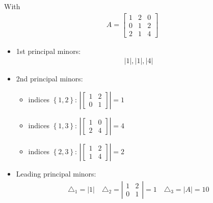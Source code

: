 \documentclass[11pt]{article}
\numberwithin{equation}{section}
\begin{document}
\begin{example}
    With \begin{align*}
        A=\left[\begin{array}{lll}
            1 & 2 & 0 \\
            0 & 1 & 2 \\
            2 & 1 & 4
            \end{array}\right]
    \end{align*}
    \begin{itemize}
        \item 1st principal minors: \begin{align*}
            |1|,|1|,|4|
        \end{align*}
        \item 2nd principal minors: \begin{itemize}
            \item indices $\left\{ 1,2 \right\}$: $\left| \left[\begin{array}{cc}
                1 & 2 \\
                0 & 1
                \end{array}\right]\right|=1$
            \item indices $\left\{ 1,3 \right\}$: $\left| \left[\begin{array}{cc}
                1 & 0 \\
                2 & 4
                \end{array}\right]\right|=4$
            \item indices $\left\{ 2,3 \right\}$: $\left| \left[\begin{array}{cc}
                1 & 2 \\
                1 & 4
                \end{array}\right]\right|=2$
        \end{itemize}
        \item Leading principal minors:\begin{align*}
            \triangle_1 = |1| \quad \triangle_2 = \left|\begin{array}{cc}
                1 & 2 \\
                0 & 1
                \end{array}\right| =1 \quad \triangle_3 = |A|=10 
        \end{align*}
    \end{itemize}
\end{example}
\end{document}
